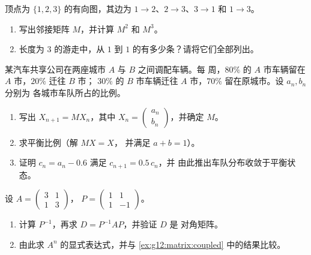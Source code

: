 \begin{exercise}[$\star\star$]\label{exo:g12:matrix:6}
顶点为 $\{1, 2, 3\}$ 的有向图，其边为
$1\to2$、$2\to3$、$3\to1$ 和 $1\to3$。
\begin{enumerate}
  \item 写出邻接矩阵 $M$，并计算 $M^2$ 和 $M^3$。
  \item 长度为 $3$ 的游走中，从 $1$ 到 $1$ 的有多少条？请将它们全部列出。
\end{enumerate}
\end{exercise}

\begin{exercise}[$\star\star$]\label{exo:g12:matrix:7}
某汽车共享公司在两座城市 $A$ 与 $B$ 之间调配车辆。每
周，$80\%$ 的 $A$ 市车辆留在 $A$ 市，$20\%$ 迁往 $B$ 市；
$30\%$ 的 $B$ 市车辆迁往 $A$ 市，$70\%$ 留在原城市。设 $a_n, b_n$ 分别为
各城市车队所占的比例。
\begin{omfigure}
\end{omfigure}
\begin{enumerate}
  \item 写出 $X_{n+1} = MX_n$，其中
        $X_n = \begin{pmatrix} a_n\\ b_n\end{pmatrix}$，并确定 $M$。
  \item 求平衡比例（解 $MX = X$，
        并满足 $a + b = 1$）。
  \item 证明 $c_n = a_n - 0.6$ 满足 $c_{n+1} = 0.5\,c_n$，并
        由此推出车队分布收敛于平衡状态。
\end{enumerate}
\end{exercise}

\begin{exercise}[$\star\star\star$]\label{exo:g12:matrix:8}
设 $A = \begin{pmatrix} 3 & 1\\ 1 & 3 \end{pmatrix}$，
$P = \begin{pmatrix} 1 & 1\\ 1 & -1 \end{pmatrix}$。
\begin{enumerate}
  \item 计算 $P^{-1}$，再求 $D = P^{-1}AP$，并验证 $D$ 是
        对角矩阵。
  \item 由此求 $A^n$ 的显式表达式，并与
        \cref{ex:g12:matrix:coupled} 中的结果比较。
\end{enumerate}
\end{exercise}

